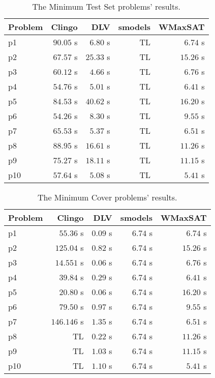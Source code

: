 \documentclass[]{article}
\begin{document}
\begin{table}[h]
\caption{The Minimum Test Set problems' results.}
\label{tab:minimum_test_set_results}
\vspace{1em}
\scriptsize
\begin{tabular}{lrrrr}
\toprule
Problem & Clingo & DLV & smodels & WMaxSAT \\
\midrule
p1 & $ 90.05 $ s   & $ 6.80 $ s    & TL & $ 6.74 $ s \\
p2 & $ 67.57 $ s   & $ 25.33 $ s   & TL & $ 15.26 $ s \\
p3 & $ 60.12 $ s   & $ 4.66 $ s    & TL & $ 6.76 $ s \\
p4 & $ 54.76 $ s   & $ 5.01 $ s    & TL & $ 6.41 $ s \\
p5 & $ 84.53 $ s   & $ 40.62 $ s   & TL & $ 16.20 $ s \\
p6 & $ 54.26 $ s   & $ 8.30 $ s    & TL & $ 9.55 $ s \\
p7 & $ 65.53 $ s   & $ 5.37 $ s    & TL & $ 6.51 $ s \\
p8 & $ 88.95 $ s   & $ 16.61 $ s   & TL & $ 11.26 $ s \\
p9 & $ 75.27 $ s   & $ 18.11 $ s   & TL & $ 11.15 $ s \\
p10 & $ 57.64 $ s  & $ 5.08 $ s    & TL & $ 5.41 $ s \\
\bottomrule
\end{tabular}
\end{table}

\begin{table}[h]
\caption{The Minimum Cover problems' results.}
\label{tab:minimum_test_set_results}
\vspace{1em}
\scriptsize
\begin{tabular}{lrrrr}
\toprule
Problem & Clingo & DLV & smodels & WMaxSAT \\
\midrule
p1 & $ 55.36 $ s    & $ 0.09 $ s    & $ 6.74 $ s & $ 6.74 $ s \\
p2 & $ 125.04 $ s   & $ 0.82 $ s    & $ 6.74 $ s & $ 15.26 $ s \\
p3 & $ 14.551 $ s   & $ 0.06 $ s    & $ 6.74 $ s & $ 6.76 $ s \\
p4 & $ 39.84 $ s    & $ 0.29 $ s    & $ 6.74 $ s & $ 6.41 $ s \\
p5 & $ 20.80 $ s    & $ 0.06 $ s    & $ 6.74 $ s & $ 16.20 $ s \\
p6 & $ 79.50 $ s    & $ 0.97 $ s    & $ 6.74 $ s & $ 9.55 $ s \\
p7 & $ 146.146 $ s  & $ 1.35 $ s    & $ 6.74 $ s & $ 6.51 $ s \\
p8 & TL             & $ 0.22 $ s    & $ 6.74 $ s & $ 11.26 $ s \\
p9 & TL             & $ 1.03 $ s    & $ 6.74 $ s & $ 11.15 $ s \\
p10 & TL            & $ 1.10 $ s    & $ 6.74 $ s & $ 5.41 $ s \\
\bottomrule
\end{tabular}
\end{table}



\end{document}
